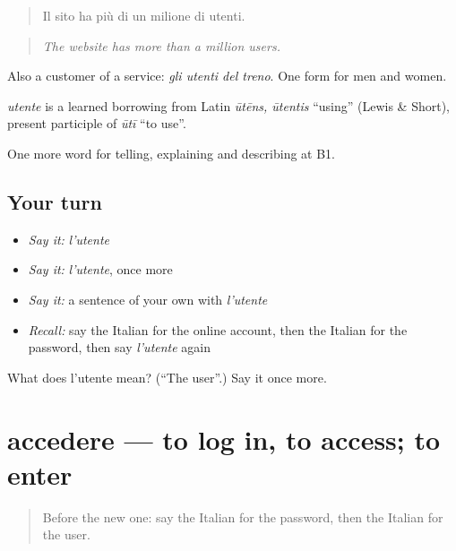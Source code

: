 \begin{quote}
Il sito ha più di un milione di utenti.
\end{quote}

\begin{quote}
\emph{The website has more than a million users.}
\end{quote}

Also a customer of a service: \emph{gli utenti del treno}. One form for men and women.

\begin{cousinweb}
\emph{utente} is a learned borrowing from Latin \emph{ūtēns, ūtentis} \textquotedblleft{}using\textquotedblright{} (Lewis \& Short), present participle of \emph{ūtī} \textquotedblleft{}to use\textquotedblright{}.
\end{cousinweb}

\begin{grammarlens}[title={What you've built}]
One more word for telling, explaining and describing at B1.
\end{grammarlens}

\subsection*{Your turn}
\begin{itemize}
\raggedright
  \item \emph{Say it:} \emph{l'utente}
  \item \emph{Say it:} \emph{l'utente}, once more
  \item \emph{Say it:} a sentence of your own with \emph{l'utente}
  \item \emph{Recall:} say the Italian for the online account, then the Italian for the password, then say \emph{l'utente} again
\end{itemize}

\begin{tcolorbox}[breakable,colback=teal!4,colframe=teal!35!black,title={Before you move on}]
What does l'utente mean? (\textquotedblleft{}The user\textquotedblright{}.) Say it once more.
\end{tcolorbox}
\section[accedere]{accedere — to log in, to access; to enter}

\label{lesson:IT-C399-accedere}



\begin{quote}
Before the new one: say the Italian for the password, then the Italian for the user.
\end{quote}

